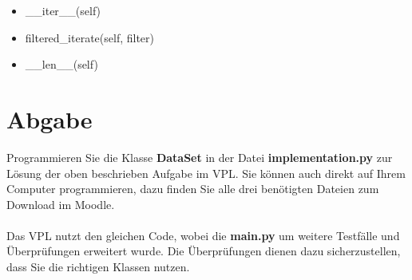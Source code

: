 \documentclass[]{article}
\begin{document}
\begin{itemize}
	\item \_\_iter\_\_(self)
	\item filtered\_iterate(self, filter)
	\item \_\_len\_\_(self)
\end{itemize}

\section{Abgabe}
Programmieren Sie die Klasse \textbf{DataSet} in der Datei \textbf{implementation.py} zur Lösung der oben beschrieben Aufgabe im VPL.
Sie können auch direkt auf Ihrem Computer programmieren, dazu finden Sie alle drei benötigten Dateien zum Download im Moodle.\\
\\
Das VPL nutzt den gleichen Code, wobei die \textbf{main.py} um weitere Testfälle und Überprüfungen erweitert wurde.
Die Überprüfungen dienen dazu sicherzustellen, dass Sie die richtigen Klassen nutzen.
\end{document}
